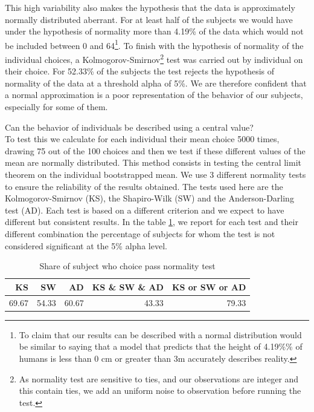 \documentclass[
]{book}
\begin{document}
This high variability also makes the hypothesis that the data is
approximately normally distributed aberrant.
For at least half of the subjects
we would have under the hypothesis of normality more than
4.19\% of the data which would not be
included between 0 and 64\footnote{To claim that our results can be described with a normal distribution
  would be similar to saying that a model that predicts that the height of
  4.19\%\% of humans is less than 0 cm or greater
  than 3m accurately describes reality.}.
To finish with the hypothesis of normality of the individual choices, a
Kolmogorov-Smirnov\footnote{As normality test are sensitive to ties, and our observations are integer
  and this contain ties, we add an uniform noise to observation before running the
  test.} test was carried out by individual on their choice.
For 52.33\% of the subjects
the test rejects the hypothesis of normality of the data at a threshold
alpha of 5\%.
We are therefore confident that a normal approximation is a poor representation
of the behavior of our subjects, especially for some of them.

Can the behavior of individuals be described using a central value?\\
To test this we calculate for
each individual their mean choice 5000 times, drawing 75 out of the 100 choices
and then we test if these different values of the mean are
normally distributed. This method consists in testing the central limit
theorem on the individual bootstrapped mean. We
use 3 different normality tests to ensure the reliability of the
results obtained. The tests used here are the Kolmogorov-Smirnov
(KS), the Shapiro-Wilk (SW) and the Anderson-Darling test (AD).
Each test is based on a different criterion and we expect to have
different but consistent results. In the table \ref{tab:norm-test4}, we report for each
test and their different combination the percentage of subjects for whom
the test is not considered significant at the 5\% alpha level.

\begin{table}

\caption{\label{tab:norm-test4}Share of subject who choice pass normality test}
\centering
\begin{tabular}[t]{rrrrr}
\toprule
KS & SW & AD & KS \& SW \& AD & KS or SW or AD\\
\midrule
69.67 & 54.33 & 60.67 & 43.33 & 79.33\\
\bottomrule
\end{tabular}
\end{table}
\end{document}
